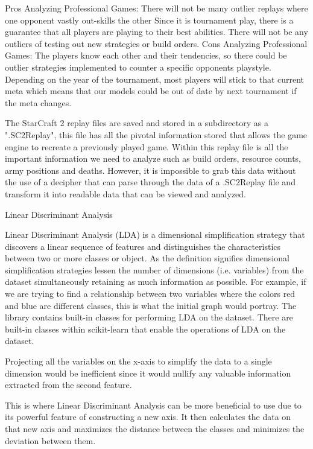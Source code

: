 \documentclass[a4paper,12pt]{report}
\begin{document}
Pros Analyzing Professional Games:
 There will not be many outlier replays where one opponent vastly out-skills the other
 Since it is tournament play, there is a guarantee that all players are playing to their best abilities. There will not be any outliers of testing out new strategies or build orders.
Cons Analyzing Professional Games:
The players know each other and their tendencies, so there could be outlier strategies implemented to counter a specific opponents playstyle.
 Depending on the year of the tournament, most players will stick to that current meta which means that our models could be out of date by next tournament if the meta changes.

The StarCraft 2 replay files are saved and stored in a subdirectory as a ".SC2Replay", this file has all the pivotal information stored that allows the game engine to recreate a previously played game. Within this replay file is all the important information we need to analyze such as build orders, resource counts, army positions and deaths. However, it is impossible to grab this data without the use of a decipher that can parse through the data of a .SC2Replay file and transform it into readable data that can be viewed and analyzed.

Linear Discriminant Analysis
 
Linear Discriminant Analysis (LDA) is a dimensional simplification strategy that discovers a linear sequence of features and distinguishes the characteristics between two or more classes or object. As the definition signifies dimensional simplification strategies lessen the number of dimensions (i.e. variables) from the dataset simultaneously retaining as much information as possible. For example, if we are trying to find a relationship between two variables where the colors red and blue are different classes, this is what the initial graph would portray. The library contains built-in classes for performing LDA on the dataset. There are built-in classes within scikit-learn that enable the operations of LDA on the dataset.


Projecting all the variables on the x-axis to simplify the data to a single dimension would be inefficient since it would nullify any valuable information extracted from the second feature.




This is where Linear Discriminant Analysis can be more beneficial to use due to its powerful feature of constructing a new axis. It then calculates the data on that new axis and maximizes the distance between the classes and minimizes the deviation between them. 
\end{document}
